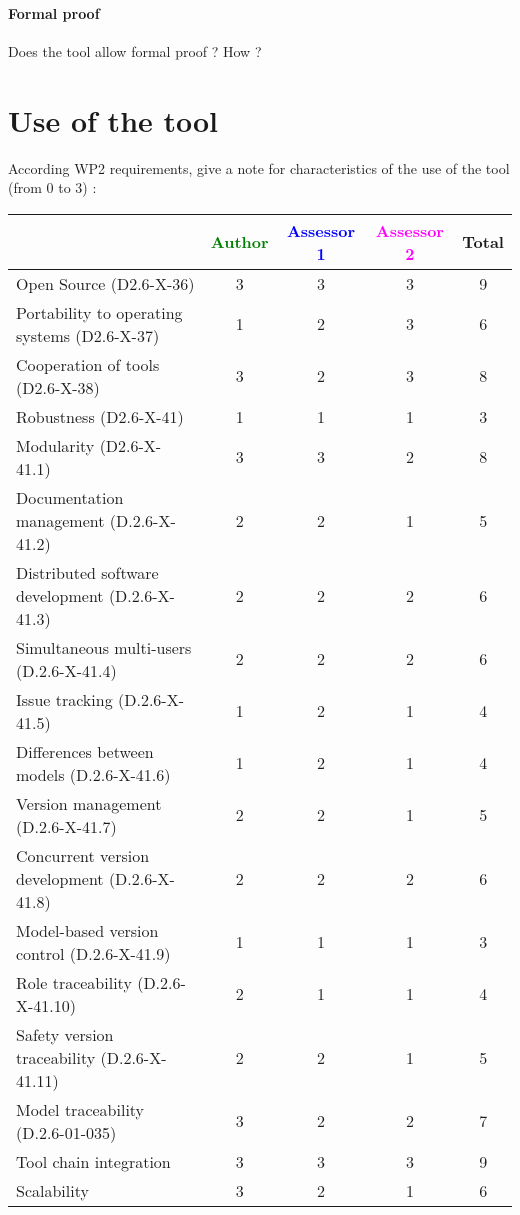 \paragraph{Formal proof}
Does the tool allow formal proof ? How ?

\section{Use of the tool}

According WP2 requirements, give a note for characteristics of the use of the tool (from 0 to 3) :

\begin{tabular}{|l | c | c | c | c|}
\hline
& \textcolor{green}{Author} & \textcolor{blue}{Assessor 1} & \textcolor{magenta}{Assessor 2} & Total \\
\hline
Open Source (D2.6-X-36) & 3 & 3 & 3 & 9 \\
\hline
Portability to operating systems (D2.6-X-37) & 1 & 2 &  3 & 6 \\
\hline
Cooperation of tools (D2.6-X-38) & 3 & 2 & 3 & 8 \\
\hline
Robustness (D2.6-X-41) & 1 & 1 & 1 & 3 \\
\hline
Modularity (D2.6-X-41.1) & 3 & 3 & 2 & 8 \\
\hline
Documentation management (D.2.6-X-41.2) & 2 & 2 & 1  & 5 \\
\hline
Distributed software development (D.2.6-X-41.3) & 2 & 2 & 2 & 6 \\
\hline
Simultaneous multi-users (D.2.6-X-41.4) & 2 & 2 & 2 & 6 \\
\hline
Issue tracking (D.2.6-X-41.5) & 1 & 2 & 1 & 4 \\
\hline
Differences between models (D.2.6-X-41.6) & 1 & 2 & 1 & 4 \\
\hline
Version management (D.2.6-X-41.7) & 2 & 2 & 1 & 5 \\
\hline
Concurrent version development (D.2.6-X-41.8) & 2 & 2 & 2 &  6\\
\hline
Model-based version control (D.2.6-X-41.9) & 1 & 1 & 1 & 3 \\
\hline
Role traceability (D.2.6-X-41.10) & 2 & 1 & 1 & 4 \\
\hline
Safety version traceability (D.2.6-X-41.11) & 2 & 2 & 1 & 5 \\
\hline
Model traceability (D.2.6-01-035) & 3 & 2 & 2 & 7 \\
\hline
Tool chain integration & 3 & 3 & 3 & 9 \\
\hline
Scalability & 3 & 2 & 1 & 6 \\
\hline
\end{tabular}

